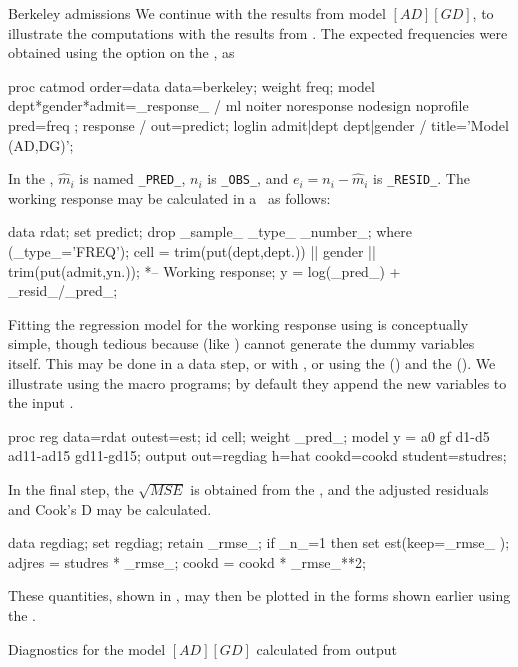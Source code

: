 \begin{Example}[berkeley10]{Berkeley admissions}
We continue with the results from model \([AD]  [GD]\),
to illustrate the computations with the results from .
The expected frequencies were obtained
using the option  on the , as 
\begin{listing}
proc catmod order=data data=berkeley;
   weight freq;
   model dept*gender*admit=_response_ /
         ml  noiter noresponse nodesign noprofile pred=freq ;
   response / out=predict;
   loglin admit|dept dept|gender / title='Model (AD,DG)';
\end{listing}
 In the  \Dset, \(\widehat{m}_i\) is named
\verb|_PRED_|, \(n_i\) is \verb|_OBS_|, and \(e_i = n_i - \widehat{m}_i\)
is \verb|_RESID_|.
The working response may be calculated in a \Dstp\ as follows:
\begin{listing}
data rdat;
   set predict;
   drop _sample_ _type_ _number_;
   where (_type_='FREQ');
   cell = trim(put(dept,dept.)) ||
          gender ||
          trim(put(admit,yn.));
    *-- Working response;
   y = log(_pred_) + _resid_/_pred_;
\end{listing}
Fitting
the regression model for the working response using  is
conceptually simple, though tedious because  
(like ) 
cannot generate the dummy variables itself.  This may be
done in a data step, or with , or using the
 () and the  ().
We illustrate using the macro programs; by default they append
the new variables to the input \Dset.
\begin{listing}

proc reg data=rdat outest=est;
   id cell;
   weight _pred_;
   model y = a0 gf d1-d5 ad11-ad15 gd11-gd15;
   output out=regdiag
          h=hat cookd=cookd student=studres;
\end{listing}
In the final step, the $\sqrt{MSE}$ is obtained from the 
\Dset, and the adjusted residuals and Cook's D may be calculated.
\begin{listing}
data regdiag;
   set regdiag;
   retain _rmse_;
   if _n_=1 then set est(keep=_rmse_ );
   adjres = studres * _rmse_;
   cookd = cookd * _rmse_**2;
\end{listing}
These quantities, shown in ,
may then be plotted in the forms shown earlier using the
.

\begin{Output}[htb]
\caption{Diagnostics for the model $[AD][GD]$ calculated from  output}\label{out:catberk4.1}
\small

\end{Output}
\end{Example}

